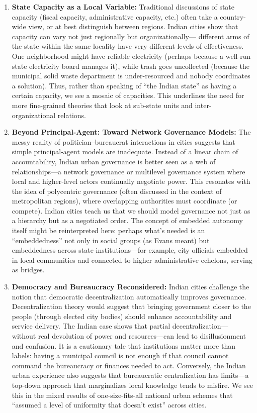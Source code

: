 \begin{enumerate}
\item \textbf{State Capacity as a Local Variable:} Traditional discussions of state capacity (fiscal capacity, administrative capacity, etc.) often take a country-wide view, or at best distinguish between regions. Indian cities show that capacity can vary not just regionally but organizationally— different arms of the state within the same locality have very different levels of effectiveness. One neighborhood might have reliable electricity (perhaps because a well-run state electricity board manages it), while trash goes uncollected (because the municipal solid waste department is under-resourced and nobody coordinates a solution). Thus, rather than speaking of ``the Indian state'' as having a certain capacity, we see a mosaic of capacities. This underlines the need for more fine-grained theories that look at sub-state units and inter-organizational relations.

\item \textbf{Beyond Principal-Agent: Toward Network Governance Models:} The messy reality of politician--bureaucrat interactions in cities suggests that simple principal-agent models are inadequate. Instead of a linear chain of accountability, Indian urban governance is better seen as a web of relationships—a network governance or multilevel governance system where local and higher-level actors continually negotiate power. This resonates with the idea of polycentric governance (often discussed in the context of metropolitan regions), where overlapping authorities must coordinate (or compete). Indian cities teach us that we should model governance not just as a hierarchy but as a negotiated order. The concept of embedded autonomy itself might be reinterpreted here: perhaps what's needed is an ``embeddedness'' not only in social groups (as Evans meant) but embeddedness across state institutions—for example, city officials embedded in local communities and connected to higher administrative echelons, serving as bridges.

\item \textbf{Democracy and Bureaucracy Reconsidered:} Indian cities challenge the notion that democratic decentralization automatically improves governance. Decentralization theory would suggest that bringing government closer to the people (through elected city bodies) should enhance accountability and service delivery. The Indian case shows that partial decentralization— without real devolution of power and resources—can lead to disillusionment and confusion. It is a cautionary tale that institutions matter more than labels: having a municipal council is not enough if that council cannot command the bureaucracy or finances needed to act. Conversely, the Indian urban experience also suggests that bureaucratic centralization has limits—a top-down approach that marginalizes local knowledge tends to misfire. We see this in the mixed results of one-size-fits-all national urban schemes that ``assumed a level of uniformity that doesn't exist'' across cities.


\end{enumerate}
